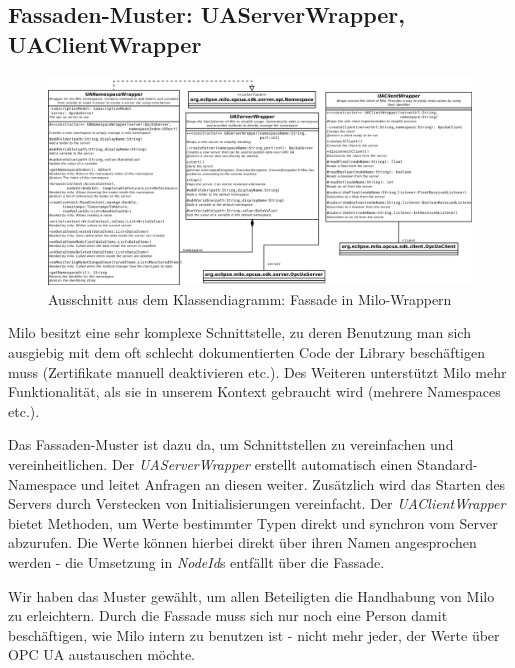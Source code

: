\documentclass[parskip=full]{scrartcl}
\begin{document}
\subsection{Fassaden-Muster: UAServerWrapper, UAClientWrapper}
\begin{figure}[H]
  \centering
  \includegraphics[scale=0.3]{design/pattern-screenshots/fascade-UAWrapper.png}
  \caption{Ausschnitt aus dem Klassendiagramm: Fassade in Milo-Wrappern}
\end{figure}
Milo besitzt eine sehr komplexe Schnittstelle, zu deren Benutzung man sich ausgiebig mit dem oft schlecht dokumentierten Code
der Library beschäftigen muss (Zertifikate manuell deaktivieren etc.). Des Weiteren unterstützt Milo mehr Funktionalität,
als sie in unserem Kontext gebraucht wird (mehrere Namespaces etc.).

Das Fassaden-Muster ist dazu da, um Schnittstellen zu vereinfachen und vereinheitlichen.
Der \emph{UAServerWrapper} erstellt automatisch einen Standard-Namespace und leitet Anfragen an
diesen weiter. Zusätzlich wird das Starten des Servers durch Verstecken von Initialisierungen vereinfacht. Der \emph{UAClientWrapper}
bietet Methoden, um Werte bestimmter Typen direkt und synchron vom Server abzurufen. Die Werte können hierbei direkt über ihren
Namen angesprochen werden - die Umsetzung in \emph{NodeId}s entfällt über die Fassade.

Wir haben das Muster gewählt, um allen
Beteiligten die Handhabung von Milo zu erleichtern. Durch die Fassade muss sich nur noch eine Person damit beschäftigen, wie
Milo intern zu benutzen ist - nicht mehr jeder, der Werte über OPC UA austauschen möchte.

\pagebreak
\end{document}
